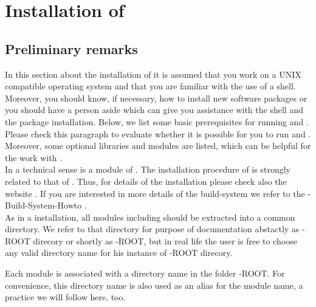 \section{Installation of \Dumux} \label{install}
\subsection{Preliminary remarks}

In this section about the installation of \Dumux it is assumed that you work on a UNIX compatible operating system and that you are familiar with the use of a shell. 
Moreover, you should know,  if necessary, how to install new software packages or you should have a person aside which can give you assistance with the shell and the package installation. 
Below, we list some basic prerequisites for running \Dune and \Dumux. 
Please check this paragraph to evaluate whether it is possible for you to run \Dune and \Dumux. 
Moreover, some optional libraries and modules are listed, which can be helpful for the work with \Dumux. \\

In a technical sense \Dumux is a module of \Dune. 
The installation procedure of \Dumux is strongly related to that of \Dune. 
Thus, for details of the installation please check also the {\Dune} website \cite{DUNE-HP}. 
If you are interested in more details of the build-system we refer to the {\Dune}-Build-System-Howto \cite{DUNE-HP}.\\

As in a \Dune installation, all \Dune modules including \Dumux should be extracted into a common directory. We refer to that directory for purpose of documentation abstactly as {\Dune}-ROOT direcory or shortly as {\Dune}-ROOT, but in real life the user is free to choose any valid directory name for his instance of {\Dune}-ROOT direcory.

Each \Dune module is associated with a directory name in the folder {\Dune}-ROOT. For convenience, this directory name is
also used as an alias for the module name, a practice we will follow here, too.



